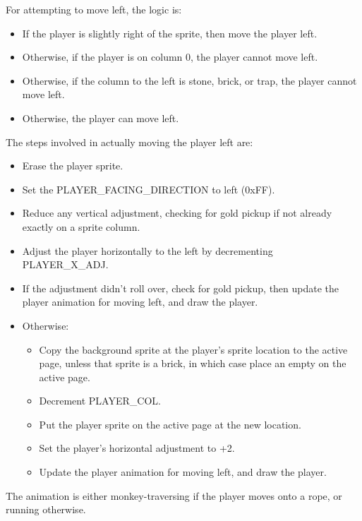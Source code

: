 \documentclass[10pt]{report}
\begin{document}
For attempting to move left, the logic is:

\begin{itemize}
  \item If the player is slightly right of the sprite, then move the player left.
  \item Otherwise, if the player is on column 0, the player cannot move left.
  \item Otherwise, if the column to the left is stone, brick, or trap, the player cannot move left.
  \item Otherwise, the player can move left.
\end{itemize}

The steps involved in actually moving the player left are:

\begin{itemize}
    \item Erase the player sprite.
    \item Set the {\Tt{}PLAYER{\_}FACING{\_}DIRECTION\nwendquote} to left ({\Tt{}0xFF\nwendquote}).
    \item Reduce any vertical adjustment, checking for gold pickup if not already exactly on a sprite column.
    \item Adjust the player horizontally to the left by decrementing {\Tt{}PLAYER{\_}X{\_}ADJ\nwendquote}.
    \item If the adjustment didn't roll over, check for gold pickup, then update
          the player animation for moving left, and draw the player.
    \item Otherwise:
    \begin{itemize}
        \item Copy the background sprite at the player's sprite location to the active page, unless
              that sprite is a brick, in which case place an empty on the active page.
        \item Decrement {\Tt{}PLAYER{\_}COL\nwendquote}.
        \item Put the player sprite on the active page at the new location.
        \item Set the player's horizontal adjustment to {\Tt{}+2\nwendquote}.
        \item Update the player animation for moving left, and draw the player.
    \end{itemize}
\end{itemize}

The animation is either monkey-traversing if the player moves onto a rope, or running otherwise.
\end{document}
